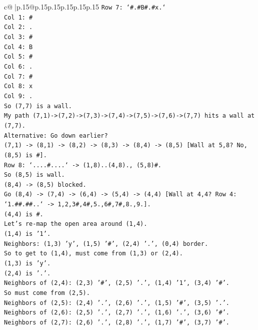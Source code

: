 \documentclass{article}
\begin{document}
{\begin{supertabular}{c@{$\;$}|p{.15\linewidth}@{}p{.15\linewidth}p{.15\linewidth}p{.15\linewidth}p{.15\linewidth}p{.15\linewidth}}
{{{\texttt{Row 7: `\#.\#B\#.\#x.`} \\
\texttt{Col 1: \#} \\
\texttt{Col 2: .} \\
\texttt{Col 3: \#} \\
\texttt{Col 4: B} \\
\texttt{Col 5: \#} \\
\texttt{Col 6: .} \\
\texttt{Col 7: \#} \\
\texttt{Col 8: x} \\
\texttt{Col 9: .} \\
\texttt{So (7,7) is a wall.} \\
\texttt{My path (7,1){-}>(7,2){-}>(7,3){-}>(7,4){-}>(7,5){-}>(7,6){-}>(7,7) hits a wall at (7,7).} \\
\texttt{Alternative: Go down earlier?} \\
\texttt{(7,1) {-}> (8,1) {-}> (8,2) {-}> (8,3) {-}> (8,4) {-}> (8,5) {[}Wall at 5,8? No, (8,5) is \#{]}.} \\
\texttt{Row 8: `....\#....` {-}> (1,8)..(4,8)., (5,8)\#.} \\
\texttt{So (8,5) is wall.} \\
\texttt{(8,4) {-}> (8,5) blocked.} \\
\texttt{Go (8,4) {-}> (7,4) {-}> (6,4) {-}> (5,4) {-}> (4,4) {[}Wall at 4,4? Row 4: `1.\#\#.\#\#..` {-}> 1,2,3\#,4\#,5.,6\#,7\#,8.,9.{]}.} \\
\texttt{(4,4) is \#.} \\
\texttt{Let's re{-}map the open area around (1,4).} \\
\texttt{(1,4) is '1'.} \\
\texttt{Neighbors: (1,3) 'y', (1,5) '\#', (2,4) '.', (0,4) border.} \\
\texttt{So to get to (1,4), must come from (1,3) or (2,4).} \\
\texttt{(1,3) is 'y'.} \\
\texttt{(2,4) is '.'.} \\
\texttt{Neighbors of (2,4): (2,3) '\#', (2,5) '.', (1,4) '1', (3,4) '\#'.} \\
\texttt{So must come from (2,5).} \\
\texttt{Neighbors of (2,5): (2,4) '.', (2,6) '.', (1,5) '\#', (3,5) '.'.} \\
\texttt{Neighbors of (2,6): (2,5) '.', (2,7) '.', (1,6) '.', (3,6) '\#'.} \\
\texttt{Neighbors of (2,7): (2,6) '.', (2,8) '.', (1,7) '\#', (3,7) '\#'.} \\
}}}
\end{supertabular}}
\end{document}

